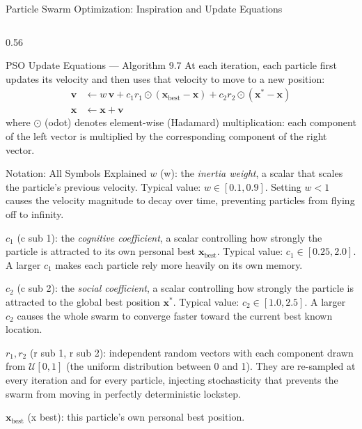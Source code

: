 \documentclass[aspectratio=169,10pt]{beamer}
\newcommand{\bx}{\mathbf{x}}
\newcommand{\bv}{\mathbf{v}}
\begin{document}
\begin{frame}[allowframebreaks]{Particle Swarm Optimization: Inspiration and Update Equations}
\begin{columns}[T]
\begin{column}{0.56\textwidth}
      \medskip
      \begin{block}{PSO Update Equations --- Algorithm 9.7}
        At each iteration, each particle first updates its velocity
        and then uses that velocity to move to a new position:
        \begin{align}
          \bv &\leftarrow w\,\bv
                + c_1 r_1 \odot (\bx_{\text{best}} - \bx)
                + c_2 r_2 \odot (\bx^* - \bx) \label{eq:pso_v}\\[4pt]
          \bx &\leftarrow \bx + \bv \label{eq:pso_x}
        \end{align}
        where $\odot$ (odot) denotes element-wise (Hadamard)
        multiplication: each component of the left vector is
        multiplied by the corresponding component of the right vector.
      \end{block}

      \begin{block}{Notation: All Symbols Explained}
        $w$ (w): the \emph{inertia weight}, a scalar that scales the
        particle's previous velocity.  Typical value: $w \in [0.1,
        0.9]$.  Setting $w < 1$ causes the velocity magnitude to
        decay over time, preventing particles from flying off to
        infinity.

        $c_1$ (c sub 1): the \emph{cognitive coefficient}, a scalar
        controlling how strongly the particle is attracted to its own
        personal best $\bx_{\text{best}}$.  Typical value: $c_1
        \in [0.25, 2.0]$.  A larger $c_1$ makes each particle rely
        more heavily on its own memory.

        $c_2$ (c sub 2): the \emph{social coefficient}, a scalar
        controlling how strongly the particle is attracted to the
        global best position $\bx^*$.  Typical value: $c_2 \in
        [1.0, 2.5]$.  A larger $c_2$ causes the whole swarm to
        converge faster toward the current best known location.

        $r_1, r_2$ (r sub 1, r sub 2): independent random vectors
        with each component drawn from $\mathcal{U}[0,1]$ (the
        uniform distribution between 0 and 1).  They are re-sampled
        at every iteration and for every particle, injecting
        stochasticity that prevents the swarm from moving in
        perfectly deterministic lockstep.

        $\bx_{\text{best}}$ (x best): this particle's own personal
        best position.


\end{block}
\end{column}
\end{columns}
\end{frame}
\end{document}
